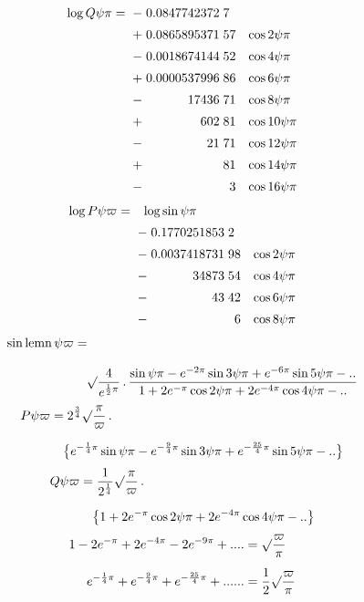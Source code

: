 \[
\begin{array}{r@{\;}c@{\;}r@{\;}l@{\quad}l}
\log Q\psi\pi={}&-&0.0847742372&7&\\[5pt]
&+&0.0865895371&57&\cos2\psi\pi\\[5pt]
&-&0.0018674144&52&\cos4\psi\pi\\[5pt]
&+&0.0000537996&86&\cos6\psi\pi\\[5pt]
&-&17436&71&\cos8\psi\pi\\[5pt]
&+&602&81&\cos10\psi\pi\\[5pt]
&-&21&71&\cos12\psi\pi\\[5pt]
&+&&81&\cos14\psi\pi\\[5pt]
&-&&\phantom{0}3&\cos16\psi\pi
\end{array}
\]
\[
\begin{array}{r@{\;}c@{\;}r@{\;}l@{\quad}l}
\log P\psi\varpi={}&\multicolumn{4}{l}{\log\sin\psi\pi}\\[5pt]
&-&0.1770251853&2&\\[5pt]
&-&0.0037418731&98&\cos2\psi\pi\\[5pt]
&-&34873&54&\cos4\psi\pi\\[5pt]
&-&43&42&\cos6\psi\pi\\[5pt]
&-&&\phantom{0}6&\cos8\psi\pi
\end{array}
\]
\[
\begin{aligned}\sin\operatorname{lemn}\psi\varpi
&=\\[8pt]&\quad{}\surd\dfrac{4}{e^{\frac12\pi}}\, .\,
\dfrac{\sin\psi\pi-e^{-2\pi}\sin3\psi\pi+e^{-6\pi}\sin5\psi\pi-\mathord{.}\mathord{.}}
{1+2e^{-\pi}\cos2\psi\pi+2e^{-4\pi}\cos4\psi\pi-\mathord{.}\mathord{.}}\end{aligned}
\]
\[
\begin{aligned}P\psi\varpi&=2^{\frac34}\surd\dfrac{\pi}{\varpi}\, .\,
\\[7pt]&\quad{}\bigl\{e^{-\frac14\pi}\sin\psi\pi-e^{-\frac94\pi}\sin3\psi\pi
+e^{-\frac{25}{4}\pi}\sin5\psi\pi-\mathord{.}\mathord{.}\bigr\}\end{aligned}
\]
\[
\begin{aligned}Q\psi\varpi&=\dfrac{1}{2^{\frac14}}\surd\dfrac{\pi}{\varpi}\, .\,
\\[7pt]&\quad{}\bigl\{1+2e^{-\pi}\cos2\psi\pi+2e^{-4\pi}\cos4\psi\pi-\mathord{.}\mathord{.}\bigr\}\end{aligned}
\]
\[
\begin{aligned}
1-2e^{-\pi}+2e^{-4\pi}-2e^{-9\pi}+\mathord{.}\mathord{.}\mathord{.}\mathord{.}
&=\surd\dfrac{\varpi}{\pi}\\[5pt]
e^{-\frac14\pi}+e^{-\frac94\pi}+e^{-\frac{25}{4}\pi}+\mathord{.}\mathord{.}\mathord{.}\mathord{.}\mathord{.}\mathord{.}
&=\dfrac12\surd\dfrac{\varpi}{\pi}
\end{aligned}
\]

